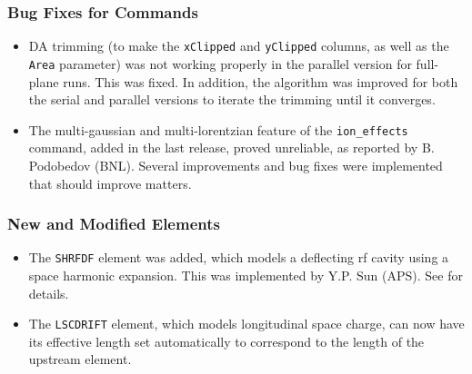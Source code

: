 \documentclass[11pt]{article}
\begin{document}
\subsubsection{Bug Fixes for Commands}
\begin{itemize}
\item DA trimming (to make the \verb|xClipped| and \verb|yClipped| columns, as well as the \verb|Area| parameter)
  was not working properly in the parallel version for full-plane runs. This was fixed. In addition, the algorithm was improved for
  both the serial and parallel versions to iterate the trimming until it converges.
\item The multi-gaussian and multi-lorentzian feature of the \verb|ion_effects| command, added in the last release, proved unreliable, 
  as reported by B. Podobedov (BNL). Several improvements and bug fixes were implemented that should improve
  matters.
\end{itemize}

\subsubsection{New and Modified Elements}
\begin{itemize}
\item The \verb|SHRFDF| element was added, which models a deflecting rf cavity using a space harmonic expansion.
  This was implemented by Y.P. Sun (APS). See \cite{Sun-NAPAC19} for details.
\item The \verb|LSCDRIFT| element, which models longitudinal space charge, can now have its effective length
  set automatically to correspond to the length of the upstream element.
\end{itemize}
\end{document}

